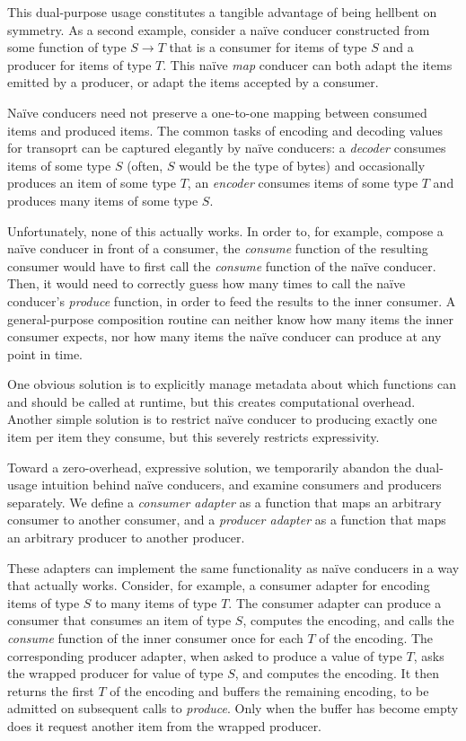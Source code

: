 \documentclass[sigplan,screen,10pt,anonymous,review]{acmart}
\begin{document}
This dual-purpose usage constitutes a tangible advantage of being hellbent on symmetry. As a second example, consider a naïve conducer constructed from some function of type $S \rightarrow T$ that is a consumer for items of type $S$ and a producer for items of type $T$. This naïve \textit{map} conducer can both adapt the items emitted by a producer, or adapt the items accepted by a consumer.%

Naïve conducers need not preserve a one-to-one mapping between consumed items and produced items. The common tasks of encoding and decoding values for transoprt can be captured elegantly by naïve conducers: a \textit{decoder} consumes items of some type $S$ (often, $S$ would be the type of bytes) and occasionally produces an item of some type $T$, an \textit{encoder} consumes items of some type $T$ and produces many items of some type $S$.

Unfortunately, none of this actually works. In order to, for example, compose a naïve conducer in front of a consumer, the \textit{consume} function of the resulting consumer would have to first call the \textit{consume} function of the naïve conducer. Then, it would need to correctly guess how many times to call the naïve conducer's \textit{produce} function, in order to feed the results to the inner consumer. A general-purpose composition routine can neither know how many items the inner consumer expects, nor how many items the naïve conducer can produce at any point in time.

One obvious solution is to explicitly manage metadata about which functions can and should be called at runtime, but this creates computational overhead. Another simple solution is to restrict naïve conducer to producing exactly one item per item they consume, but this severely restricts expressivity.

Toward a zero-overhead, expressive solution, we temporarily abandon the dual-usage intuition behind naïve conducers, and examine consumers and producers separately. We define a \textit{consumer adapter} as a function that maps an arbitrary consumer to another consumer, and a \textit{producer adapter} as a function that maps an arbitrary producer to another producer.

These adapters can implement the same functionality as naïve conducers in a way that actually works. Consider, for example, a consumer adapter for encoding items of type $S$ to many items of type $T$. The consumer adapter can produce a consumer that consumes an item of type $S$, computes the encoding, and calls the \textit{consume} function of the inner consumer once for each $T$ of the encoding. The corresponding producer adapter, when asked to produce a value of type $T$, asks the wrapped producer for value of type $S$, and computes the encoding. It then returns the first $T$ of the encoding and buffers the remaining encoding, to be admitted on subsequent calls to \textit{produce}. Only when the buffer has become empty does it request another item from the wrapped producer.
\end{document}
